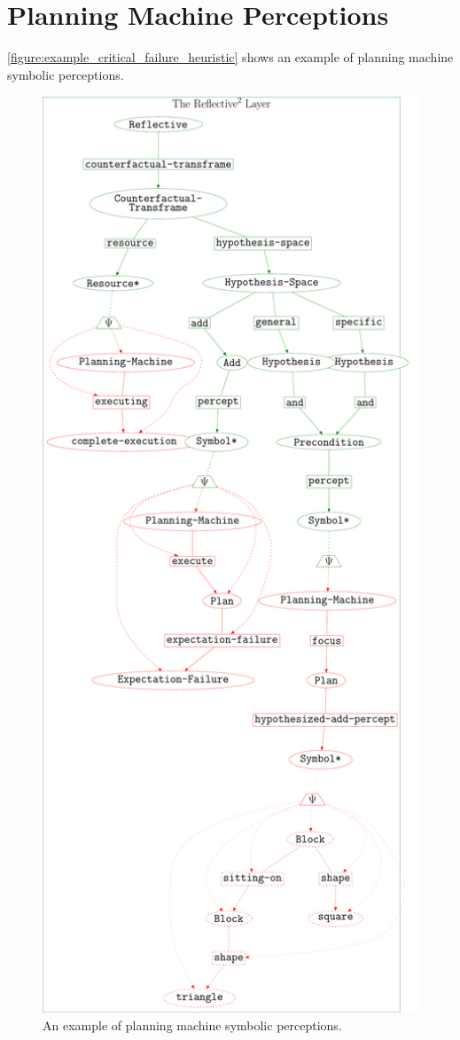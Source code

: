 \section{Planning Machine Perceptions}

{\mbox{\autoref{figure:example_critical_failure_heuristic}}} shows an
example of planning machine symbolic perceptions.
\begin{figure}
\includegraphics[width=14cm]{gfx/example_critical_failure_heuristic}
\caption[An example of planning machine symbolic perceptions.]{An
  example of planning machine symbolic perceptions.}
\label{figure:example_critical_failure_heuristic}
\end{figure}


